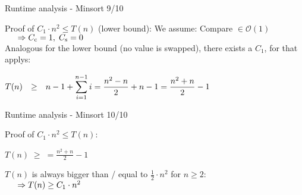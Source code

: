 
\begin{frame}{Runtime analysis - Minsort 9/10}
  \begin{block}{Proof of $C_1 \cdot n^2 \leq T(n)$
      ({\color{Mittel-Gruen}lower bound}):}
    We assume: Compare $\in \mathcal{O}(1)$\\
    $\hspace{1.5em}\Rightarrow C_\text{c} = 1, \; C_\text{s} = 0$\\
    \vspace*{0.5em}
    Analogous for the {\color{Mittel-Gruen}lower bound}
    (no value is swapped), there exists a $C_1$, for that
    applys:\\[0.5em]
    \begin{centering}
      \begin{math}
        \begin{array}{@{}rcl@{}}
          T(n) & \geq &
          \displaystyle
          n - 1 + \sum^{n - 1}_{i=1} i
          = \frac{n^2 - n}{2} + n - 1
          = \frac{n^2 + n}{2} - 1
        \end{array}
      \end{math}
    \end{centering}
  \end{block}
\end{frame}


\begin{frame}{Runtime analysis - Minsort 10/10}
  \begin{block}{Proof of $C_1 \cdot n^2 \leq T(n)$:}
    \vspace*{0.5em}
    \begin{center}
      $\displaystyle
        T(n) \; \geq \;
          = \frac{n^2 + n}{2} - 1
      $\\
    \end{center}
    $T(n)$ is always bigger than / equal to $\frac{1}{2} \cdot n^2$
    for $n \geq 2$:\\[1.0em]
    $\hspace*{1.5em}\Rightarrow T(n) \geq C_1 \cdot n^2$
  \end{block}
\end{frame}


